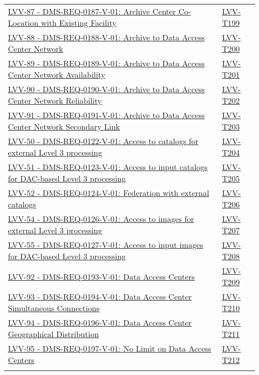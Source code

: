 {\begin{longtable}[]{p{13cm}p{3cm}}
\href{https://jira.lsstcorp.org/browse/LVV-87}{LVV-87 - DMS-REQ-0187-V-01: Archive Center Co-Location with Existing Facility}
& {
\hyperref[lvv-t199]{LVV-T199}
} \\
\href{https://jira.lsstcorp.org/browse/LVV-88}{LVV-88 - DMS-REQ-0188-V-01: Archive to Data Access Center Network}
& {
\hyperref[lvv-t200]{LVV-T200}
} \\
\href{https://jira.lsstcorp.org/browse/LVV-89}{LVV-89 - DMS-REQ-0189-V-01: Archive to Data Access Center Network Availability}
& {
\hyperref[lvv-t201]{LVV-T201}
} \\
\href{https://jira.lsstcorp.org/browse/LVV-90}{LVV-90 - DMS-REQ-0190-V-01: Archive to Data Access Center Network Reliability}
& {
\hyperref[lvv-t202]{LVV-T202}
} \\
\href{https://jira.lsstcorp.org/browse/LVV-91}{LVV-91 - DMS-REQ-0191-V-01: Archive to Data Access Center Network Secondary Link}
& {
\hyperref[lvv-t203]{LVV-T203}
} \\
\href{https://jira.lsstcorp.org/browse/LVV-50}{LVV-50 - DMS-REQ-0122-V-01: Access to catalogs for external Level 3 processing}
& {
\hyperref[lvv-t204]{LVV-T204}
} \\
\href{https://jira.lsstcorp.org/browse/LVV-51}{LVV-51 - DMS-REQ-0123-V-01: Access to input catalogs for DAC-based Level 3 processing}
& {
\hyperref[lvv-t205]{LVV-T205}
} \\
\href{https://jira.lsstcorp.org/browse/LVV-52}{LVV-52 - DMS-REQ-0124-V-01: Federation with external catalogs}
& {
\hyperref[lvv-t206]{LVV-T206}
} \\
\href{https://jira.lsstcorp.org/browse/LVV-54}{LVV-54 - DMS-REQ-0126-V-01: Access to images for external Level 3 processing}
& {
\hyperref[lvv-t207]{LVV-T207}
} \\
\href{https://jira.lsstcorp.org/browse/LVV-55}{LVV-55 - DMS-REQ-0127-V-01: Access to input images for DAC-based Level 3 processing}
& {
\hyperref[lvv-t208]{LVV-T208}
} \\
\href{https://jira.lsstcorp.org/browse/LVV-92}{LVV-92 - DMS-REQ-0193-V-01: Data Access Centers}
& {
\hyperref[lvv-t209]{LVV-T209}
} \\
\href{https://jira.lsstcorp.org/browse/LVV-93}{LVV-93 - DMS-REQ-0194-V-01: Data Access Center Simultaneous Connections}
& {
\hyperref[lvv-t210]{LVV-T210}
} \\
\href{https://jira.lsstcorp.org/browse/LVV-94}{LVV-94 - DMS-REQ-0196-V-01: Data Access Center Geographical Distribution}
& {
\hyperref[lvv-t211]{LVV-T211}
} \\
\href{https://jira.lsstcorp.org/browse/LVV-95}{LVV-95 - DMS-REQ-0197-V-01: No Limit on Data Access Centers}
& {
\hyperref[lvv-t212]{LVV-T212}
} \\
\tabularnewline
\bottomrule
\end{longtable}
} %
